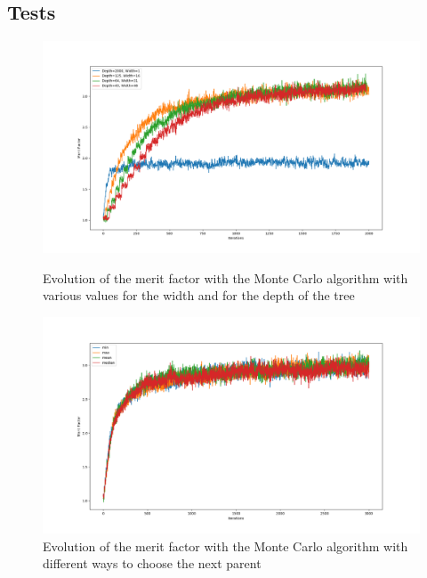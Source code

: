 \documentclass[a4paper,11pt,openany]{article}
\begin{document}
\subsection{Tests}
\begin{figure}[H]
\centering
\begin{minipage}{.45\textwidth}
  \begin{center}
  \includegraphics[scale=0.21]{Images/mc_width_depth}
  \caption{Evolution of the merit factor with the Monte Carlo algorithm with various values for the width and for the depth of the tree}
  \label{fig:mc_width_depth}
  \end{center}
\end{minipage}%
\hfill
\begin{minipage}{.45\textwidth}
  \begin{center}
  \includegraphics[scale=0.21]{Images/mc_merit_factor_back}
  \caption{Evolution of the merit factor with the Monte Carlo algorithm with different ways to choose the next parent}
  \label{fig:mc_merit_factor_back}
  \end{center}
\end{minipage}
\end{figure}
\end{document}
